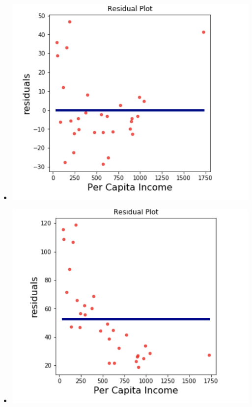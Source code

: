 \begin{enumerate}
\begin{multicols}{3}
\begin{itemize}[label=\bubble]
\item \includegraphics[scale=0.4]{resid1.png}
\item \includegraphics[scale=0.4]{resid3.png}
\end{itemize} 
\end{multicols}
\\ 
\vfill


\end{enumerate}
